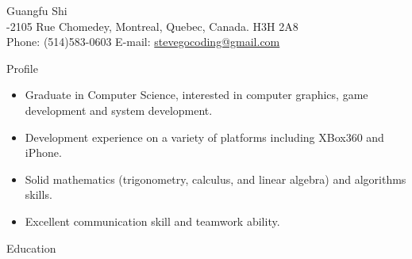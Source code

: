 \documentclass[10pt]{article}
\newenvironment{myitemize}{\begin{itemize} %
        \setlength{\itemsep}{0.25em} 
        \setlength{\topsep}{\itemsep} 
        \setlength{\labelsep}{1em}
        \setlength{\parskip}{0em}
        \setlength{\partopsep}{0em}
}%
{ \end{itemize} }
\begin{document}
 
\date{}
\newlength{\oldcvlabelwidth}
\newlength{\oldcvlabelsep}





\begin{cv} {{\large Guangfu Shi}\\
    { \normalsize {}-2105 Rue Chomedey, Montreal, Quebec, Canada. H3H 2A8\\ 
    Phone: {\mdseries (514)583-0603}  
    \hfill E-mail: {\mdseries \href{mailto:stevegocoding@gmail.com} {stevegocoding@gmail.com}}
    }
}


\setlength{\oldcvlabelwidth}{\cvlabelwidth}
\setlength{\oldcvlabelsep}{\cvlabelsep}
\setlength{\cvlabelwidth}{0.5em}

%

\begin{cvlist}{Profile} 
\item
    \begin{myitemize}
        \item Graduate in Computer Science, interested in computer graphics, game development and system development.
        \item Development experience on a variety of platforms including XBox360 and iPhone.
        \item Solid mathematics (trigonometry, calculus, and linear algebra) and algorithms skills. 
        \item Excellent communication skill and teamwork ability. 

    \end{myitemize}
\end{cvlist}


\setlength{\cvlabelwidth}{1em}

\begin{cvlist}{Education}
    

\end{cvlist}
\end{cv}
\end{document}
